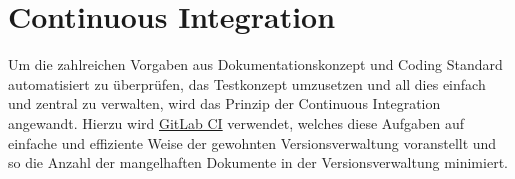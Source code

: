 \section{Continuous Integration}
Um die zahlreichen Vorgaben aus Dokumentationskonzept und Coding Standard automatisiert zu überprüfen, das Testkonzept  umzusetzen und all dies einfach und zentral zu verwalten, wird das Prinzip der Continuous Integration angewandt. Hierzu wird \href{https://docs.gitlab.com/ee/ci/README.html}{GitLab CI} verwendet, welches diese Aufgaben auf einfache und effiziente Weise der gewohnten Versionsverwaltung voranstellt und so die Anzahl der mangelhaften Dokumente in der Versionsverwaltung minimiert.